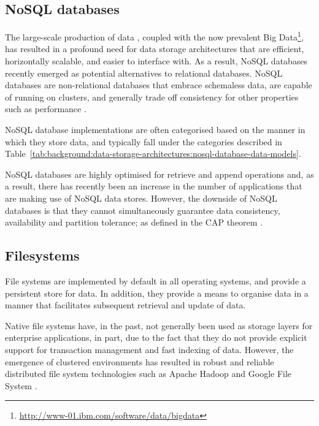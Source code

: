 \subsection{NoSQL databases}
\label{sec:background:data-storage-architectures:nosql-databases}

The large-scale production of data \citep{Gantz2008}, coupled with the now
prevalent Big Data\footnote{\url{http://www-01.ibm.com/software/data/bigdata}},
has resulted in a profound need for data storage architectures that are
efficient, horizontally scalable, and easier to interface with. As a result,
NoSQL databases recently emerged as potential alternatives to relational
databases. NoSQL databases are non-relational databases that embrace schemaless
data, are capable of running on clusters, and generally trade off consistency
for other properties such as performance \citep[see][chap.
1]{Sadalage2004}.

NoSQL database implementations are often categorised based on the manner in
which they store data, and typically fall under the categories described in
Table~\ref{tab:background:data-storage-architectures:nosql-database-data-models}.

\tablespacing

\bodyspacing

NoSQL databases are highly optimised for retrieve and append operations and,
as a result, there has recently been an increase in the number of applications
that are making use of NoSQL data stores. However, the downside of NoSQL
databases is that they cannot simultaneously guarantee data consistency, availability and partition tolerance; as defined in the CAP theorem
\citep{Gilbert2002}.

\subsection{Filesystems}
\label{sec:background:data-storage-architectures:file-systems}

File systems are implemented by default in all operating systems, and provide a
persistent store for data. In addition, they provide a means to organise data
in a manner that facilitates subsequent retrieval and update of data.

Native file systems have, in the past, not generally been used as storage layers
for enterprise applications, in part, due to the fact that they do not provide
explicit support for transaction management and fast indexing of data. However,
the emergence of clustered environments has resulted in robust and
reliable distributed file system technologies such as Apache Hadoop
\citep{Borthakur2007} and Google File System \citep{Ghemawat2003}.

